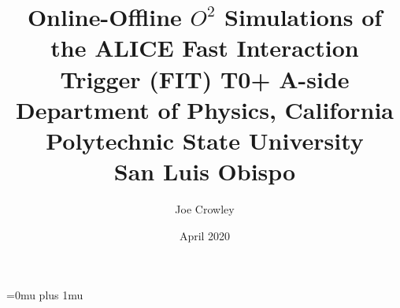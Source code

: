 \documentclass[12pt]{report}
\title{
{Online-Offline $O^2$ Simulations of the ALICE Fast Interaction Trigger (FIT) T0+ A-side}\\
{\large Department of Physics, California Polytechnic State University}\\
{\large San Luis Obispo}\\
}
\author{Joe Crowley}
\date{April 2020}
\begin{document}
\maketitle
\tableofcontents





 
 
\newpage
\Urlmuskip=0mu plus 1mu\relax


\end{document}

